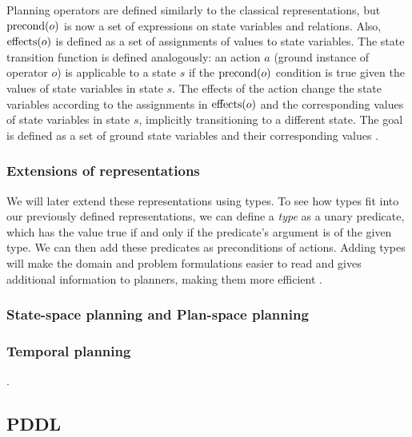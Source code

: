 Planning operators are defined similarly to the classical representations, but
$\operatorname{\textrm{precond}}(o)$ is now a set of expressions on state variables and relations.
Also, $\operatorname{\textrm{effects}}(o)$ is defined as a set of assignments of values to state variables.
The state transition function is defined analogously: an action $a$ (ground instance
of operator $o$)
is applicable to a state $s$ if the $\operatorname{\textrm{precond}}(o)$ condition is true given the values
of state variables in state $s$. The effects of the action change the state variables
according to the assignments in $\operatorname{\textrm{effects}}(o)$ and the corresponding values of state
variables in state $s$, implicitly transitioning to a different state.
The goal is defined as a set of ground state variables and their corresponding values
\citep[Section~2.5.2]{Ghallab2004}.


\subsubsection{Extensions of representations}

We will later extend these representations using types.
To see how types fit into our previously defined representations, we can
define a \textit{type} as a unary predicate, which has the value true
if and only if the predicate's argument is of the given type.
We can then add these predicates as preconditions of actions.
Adding types will make the domain and problem formulations
easier to read and gives additional information
to planners, making them more efficient \citep[Section 2.4.1]{Ghallab2004}.

\subsubsection{State-space planning and Plan-space planning}


\subsubsection{Temporal planning}

.

\subsection{PDDL}\label{pddl}

